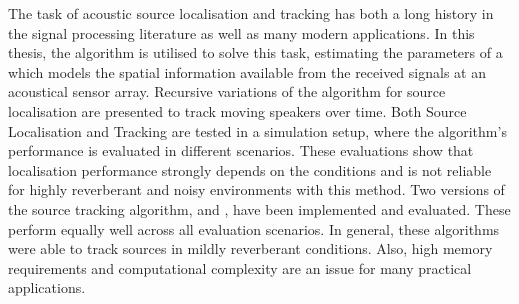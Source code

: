 The task of acoustic source localisation and tracking has both a long history in the signal processing literature as well as many modern applications. In this thesis, the  algorithm is utilised to solve this task, estimating the parameters of a  which models the spatial information available from the received signals at an acoustical sensor array. Recursive variations of the algorithm for source localisation are presented to track moving speakers over time. Both Source Localisation and Tracking are tested in a simulation setup, where the algorithm's performance is evaluated in different scenarios. These evaluations show that localisation performance strongly depends on the conditions and is not reliable for highly reverberant and noisy environments with this method. Two versions of the source tracking algorithm,  and , have been implemented and evaluated. These perform equally well across all evaluation scenarios. In general, these algorithms were able to track sources in mildly reverberant conditions. Also, high memory requirements and computational complexity are an issue for many practical applications.